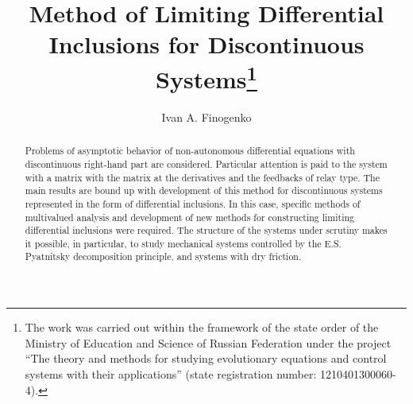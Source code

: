 \documentclass[12pt]{llncs}
\begin{document}
%
\fi
\title{Method of Limiting Differential Inclusions for Discontinuous Systems\thanks{	The work was carried out within the framework of the state order of the Ministry of Education and Science of Russian Federation under the project ``The theory and methods for studying evolutionary equations and control systems with their applications'' (state registration number: 1210401300060-4).}}
	
	

%
%
\author{Ivan A. Finogenko }
%
%
%
\institute{Matrosov Institute of System Dynamics and Control Theory SB~RAS, Irkutsk, Russia,\\
\email{fin2709@mail.ru}
}

\maketitle              %

	

	
	
	
	
	
	\begin{abstract}Problems of asymptotic behavior of non-autonomous differential equations with discontinuous right-hand part  are considered. Particular attention is paid to the system with a matrix with the matrix at the derivatives and  the feedbacks of relay type. The main results are bound up with development of this method for discontinuous systems represented in the form of differential inclusions. In this case, specific methods of multivalued analysis and development of new methods for constructing limiting differential inclusions were required. The structure of the systems under scrutiny makes it possible, in particular, to study mechanical systems controlled by the E.S. Pyatnitsky decomposition principle, and systems with dry friction.	
		
	\end{abstract}
	
\end{document}
